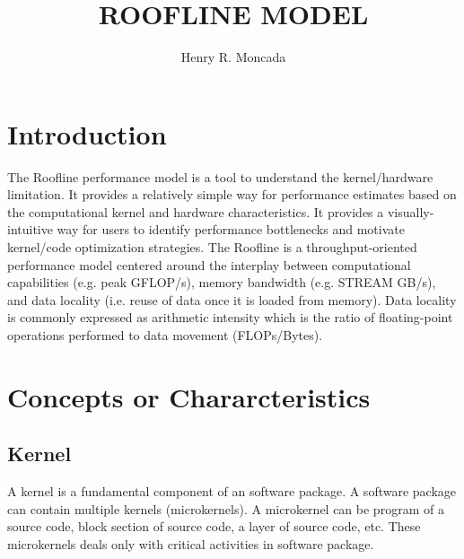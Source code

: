 \documentclass{article}
\begin{document}

\title{ROOFLINE MODEL}
\author{Henry R. Moncada}
\maketitle
\tableofcontents        %

\section{Introduction}
\noindent The Roofline performance model is a tool to understand the kernel/hardware limitation.%
It provides a relatively simple way for performance estimates based on the computational kernel and hardware characteristics.
It provides a visually-intuitive way for users to identify performance bottlenecks and motivate kernel/code optimization strategies. 
The Roofline is a throughput-oriented performance model centered around the interplay between computational capabilities (e.g. peak GFLOP/s),
memory bandwidth (e.g. STREAM GB/s), and data locality (i.e. reuse of data once it is loaded from memory). 
Data locality is commonly expressed as arithmetic intensity which is the ratio of floating-point operations performed to data movement (FLOPs/Bytes).
\section{Concepts or Chararcteristics}
\subsection{Kernel} 
A kernel is a fundamental component of an software package. A software package can contain multiple kernels (microkernels). 
A microkernel can be  program of a source code, block section of source code, a layer of source code, etc. 
These microkernels deals only with critical activities in software package.
\end{document}
